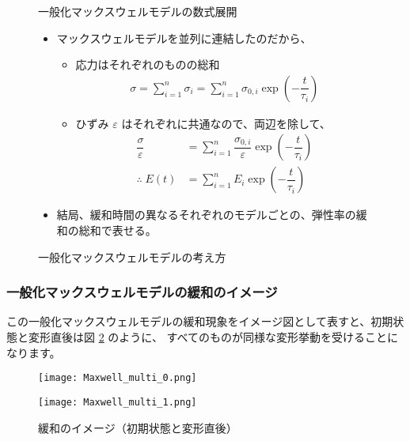 \documentclass[uplatex,dvipdfmx,a4paper,11pt]{jsarticle}
\begin{document}
\begin{figure}[htb]
	\begin{center}
		\begin{minipage}{0.9\textwidth}
			\begin{itembox}[l]{一般化マックスウェルモデルの数式展開}
				\begin{itemize}
					\item マックスウェルモデルを並列に連結したのだから、
					\begin{itemize}
						\item 応力はそれぞれのものの総和
						\begin{align*}
							\sigma = \sum_{i=1}^n \sigma_i
								= \sum_{i=1}^n \sigma_{0,i}\exp\left(-\dfrac{t}{\tau_i} \right)
						\end{align*}
						\item ひずみ $\varepsilon$ はそれぞれに共通なので、両辺を除して、
						\begin{align*}
							\dfrac{\sigma}{\varepsilon} &= \sum_{i=1}^n \dfrac{\sigma_{0,i}}{\varepsilon}\exp\left(-\dfrac{t}{\tau_i} \right) \\
							\therefore \; E(t) &= \sum_{i=1}^n E_i \exp\left(-\dfrac{t}{\tau_i} \right)
						\end{align*}
					\end{itemize}
					\item 結局、緩和時間の異なるそれぞれのモデルごとの、弾性率の緩和の総和で表せる。
				\end{itemize}
			\end{itembox}
		\end{minipage}
		\caption{一般化マックスウェルモデルの考え方}
		\label{fig:kanngae_gen_max}
	\end{center}
\end{figure}

\subsubsection{一般化マックスウェルモデルの緩和のイメージ}
この一般化マックスウェルモデルの緩和現象をイメージ図として表すと、初期状態と変形直後は図 \ref{fig:img_gen_max_0} のように、
すべてのものが同様な変形挙動を受けることになります。

\begin{figure}[htb]
	\begin{center}
		\begin{minipage}{0.45\textwidth}
			\begin{center}
				\texttt{[image: Maxwell\_multi\_0.png]}
			\end{center}
		\end{minipage}
		\begin{minipage}{0.45\textwidth}
			\begin{center}
				\texttt{[image: Maxwell\_multi\_1.png]}
			\end{center}
		\end{minipage}
		\caption{緩和のイメージ（初期状態と変形直後）}
		\label{fig:img_gen_max_0}
	\end{center}
\end{figure}
\end{document}
